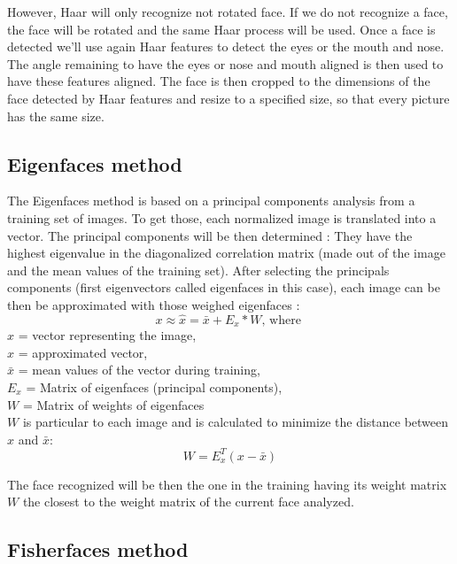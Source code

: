 However, Haar will only recognize not rotated face. If we do not recognize a face, the face will be rotated and the same Haar process will be used. Once a face is detected we'll use again Haar features to detect the eyes or the mouth and nose. The angle remaining to have the eyes or nose and mouth aligned is then used to have these features aligned. The face is then cropped to the dimensions of the face detected by Haar features and resize to a specified size, so that every picture has the same size.

\subsection{Eigenfaces method}

The Eigenfaces method is based on a principal components analysis from a training set of images. To get those, each normalized image is translated into a vector. The principal components will be then determined : They have the highest eigenvalue in the diagonalized correlation matrix (made out of the image and the mean values of the training set). After selecting the principals components (first eigenvectors called eigenfaces in this case), each image can be then be approximated with those weighed eigenfaces :
\begin{equation}
x \approx  \hat{x} = \bar{x} + E_{x} * W \textrm{, where } 
\end{equation}
$x$ = vector representing the image,\\
$\hat{x}$ = approximated vector,\\
$\bar{x}$ = mean values of the vector during training,\\
$E_{x}$ = Matrix of eigenfaces (principal components),\\
$W$ = Matrix of weights of eigenfaces\\

$W$ is particular to each image and is calculated to minimize the distance between $x$ and $\bar{x}$:
\begin{equation}
W = E_{x}^T (x-\bar{x}) 
\end{equation}

The face recognized will be then the one in the training having its weight matrix $W$ the closest to the weight matrix of the current face analyzed. 

\subsection{Fisherfaces method}

